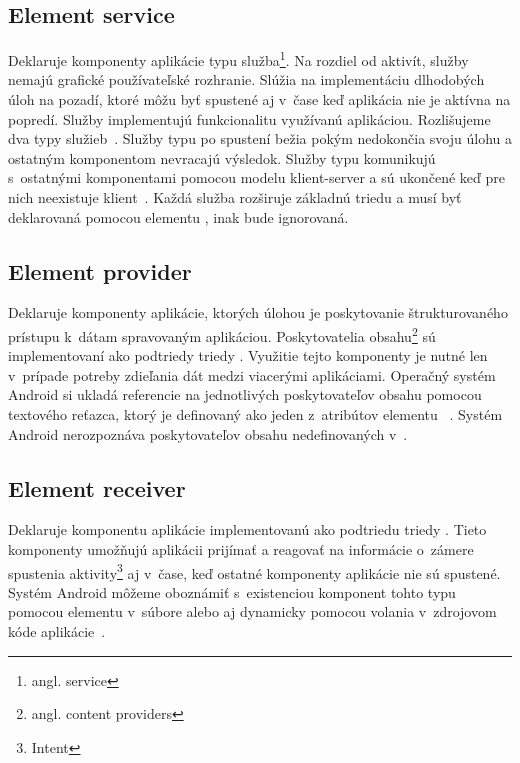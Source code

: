 \subsection{Element service}
Deklaruje komponenty aplikácie typu služba\footnote{angl. service}. Na rozdiel od aktivít, služby nemajú grafické používateľské rozhranie. Slúžia na implementáciu dlhodobých úloh na pozadí, ktoré môžu byť spustené aj v~čase keď aplikácia nie je aktívna na popredí. 
Služby implementujú funkcionalitu využívanú aplikáciou. Rozlišujeme dva typy služieb~\cite{elService}. Služby typu  po spustení bežia pokým nedokončia svoju úlohu a ostatným komponentom nevracajú výsledok. Služby typu  komunikujú s~ostatnými komponentami pomocou modelu klient-server a sú ukončené keď pre nich neexistuje klient~\cite{boundService}. Každá služba rozširuje základnú triedu  a musí byť deklarovaná pomocou elementu , inak bude ignorovaná.

\subsection{Element provider}
Deklaruje komponenty aplikácie, ktorých úlohou je poskytovanie štrukturovaného prístupu k~dátam spravovaným aplikáciou. Poskytovatelia obsahu\footnote{angl. content providers} sú implementovaní ako podtriedy triedy . Využitie tejto komponenty je nutné len v~prípade potreby zdieľania dát medzi viacerými aplikáciami. Operačný systém Android si ukladá referencie na jednotlivých poskytovateľov obsahu pomocou  textového reťazca, ktorý je definovaný ako jeden z~atribútov elementu ~\cite{elContentProvider}. Systém Android nerozpoznáva poskytovateľov obsahu nedefinovaných v~.

\subsection{Element receiver}
Deklaruje komponentu aplikácie implementovanú ako podtriedu triedy . Tieto komponenty umožňujú aplikácii prijímať a reagovať na informácie o~zámere spustenia aktivity\footnote{Intent} aj v~čase, keď ostatné komponenty aplikácie nie sú spustené. Systém Android môžeme oboznámiť s~existenciou komponent tohto typu pomocou elementu  v~súbore  alebo aj dynamicky pomocou volania  v~zdrojovom kóde aplikácie~\cite{elReceiver}.

